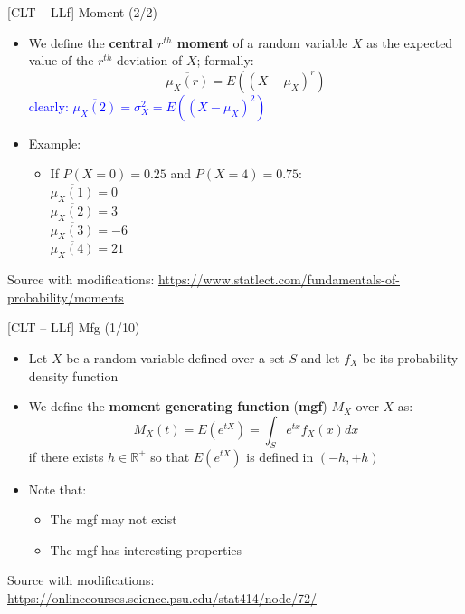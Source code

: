 \documentclass{beamer}
\begin{document}
\begin{frame}
{\centerline{[CLT -- LLf] Moment (2/2)}}


\begin{itemize}
\item We define the \textbf{central $r^{th}$ moment} of a random variable $X$ as the expected value of the $r^{th}$ deviation of $X$; formally:
$$ \overline{\mu_X(r)} = E((X-\mu_X)^r)$$
\textcolor{blue}{clearly: $ \overline{\mu_X(2)} = \sigma_X^2 = E((X-\mu_X)^2)$}
\item Example:
\begin{itemize}
\item If $P(X=0) = 0.25$ and $P(X=4) = 0.75$:\\
$\overline{\mu_X(1)} = 0$\\
$\overline{\mu_X(2)} = 3$\\
$\overline{\mu_X(3)} = -6$\\
$\overline{\mu_X(4)} = 21$\\
\end{itemize}

\end{itemize}

\begin{center}
\tiny 
Source with modifications: \url{https://www.statlect.com/fundamentals-of-probability/moments}
\end{center}
\end{frame}



\begin{frame}
{\centerline{[CLT -- LLf] Mfg (1/10)}}

\begin{itemize}
\item Let $X$ be a random variable defined over a set $S$ and let $f_X$ be its probability density function
\item We define the \textbf{moment generating function} (\textbf{mgf}) $M_X$ over $X$ as:
$$M_X(t) = E(e^{tX}) = \int_S e^{tx}f_X(x)dx$$
if there exists $h \in \mathbb{R^+}$ so that $E(e^{tX})$ is defined in $(-h,+h)$
\item Note that:
\begin{itemize}
\item The mgf may not exist 
\item The mgf has interesting properties
\end{itemize}

\end{itemize}

\begin{center}
\tiny 
Source with modifications: \url{https://onlinecourses.science.psu.edu/stat414/node/72/}
\end{center}
\end{frame}
\end{document}
